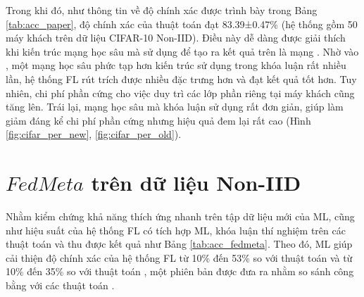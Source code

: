 Trong khi đó, như thông tin về độ chính xác được trình bày trong Bảng \ref{tab:acc_paper}, độ chính xác của thuật toán  đạt 83.39±0.47\% (hệ thống gồm 50 máy khách trên dữ liệu CIFAR-10 Non-IID). Điều này dễ dàng được giải thích khi kiến trúc mạng học sâu mà  sử dụng để tạo ra kết quả trên là mạng  \cite{howard2017mobilenets}. Nhờ vào , một mạng học sâu phức tạp hơn kiến trúc sử dụng trong khóa luận rất nhiều lần, hệ thống FL rút trích được nhiều đặc trưng hơn và đạt kết quả tốt hơn. Tuy nhiên, chi phí phần cứng cho việc duy trì các lớp phần riêng tại máy khách cũng tăng lên. Trái lại, mạng học sâu mà khóa luận sử dụng rất đơn giản, giúp làm giảm đáng kể chi phí phần cứng nhưng hiệu quả đem lại rất cao (Hình \ref{fig:cifar_per_new}, \ref{fig:cifar_per_old}).

\section{$FedMeta$ trên dữ liệu Non-IID}


Nhằm kiểm chứng khả năng thích ứng nhanh trên tập dữ liệu mới của ML, cũng như hiệu suất của hệ thống FL có tích hợp ML, khóa luận thí nghiệm trên các thuật toán  và thu được kết quả như Bảng \ref{tab:acc_fedmeta}. Theo đó, ML giúp cải thiện độ chính xác của hệ thống FL từ 10\% đến 53\% so với thuật toán  và từ 10\% đến 35\% so với thuật toán , một phiên bản được đưa ra nhằm so sánh công bằng với các thuật toán .

\begin{table}[H]
    \centering
    \caption{Bảng độ chính xác (\%) của thuật toán FedAvg và các thuật toán FedMeta tính trên điểm dữ liệu (dữ liệu Non-IID)}
    \label{tab:acc_fedmeta}
\end{table}

